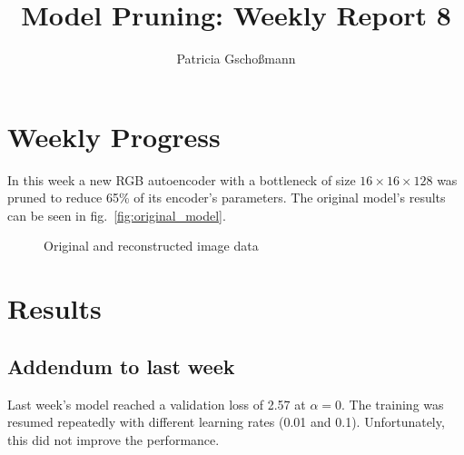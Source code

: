 \documentclass[10pt,twocolumn,letterpaper]{article}
\begin{document}
\title{Model Pruning: Weekly Report 8}
\author{Patricia Gschoßmann}

\maketitle

\section{Weekly Progress}
In this week a new RGB autoencoder with a bottleneck of size $16\times16\times128$ was pruned to reduce 65\% of its encoder's parameters.
The original model's results can be seen in fig.~\ref{fig:original_model}.
\begin{figure}[hpbt]
	\centering
	\qquad
	\caption[]{Original and reconstructed image data}
	\label{fig:results}
\end{figure}

\section{Results}
\subsection{Addendum to last week}
Last week's model reached a validation loss of 2.57 at $\alpha=0$.
The training was resumed repeatedly with different learning rates (0.01 and 0.1).
Unfortunately, this did not improve the performance.
\end{document}
